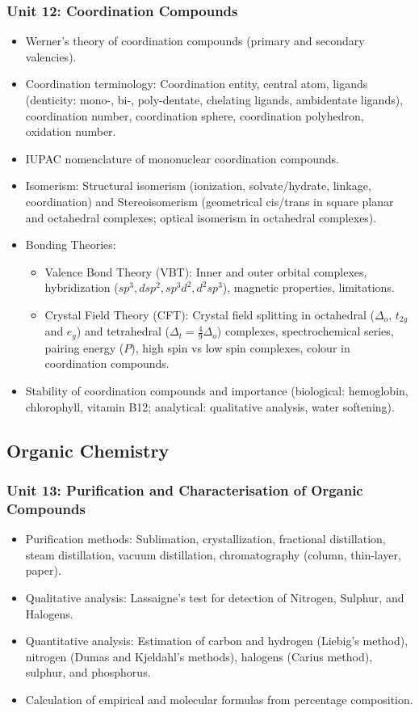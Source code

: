 \documentclass[11pt,a4paper]{article}
\begin{document}
\subsubsection{Unit 12: Coordination Compounds}
\begin{itemize}
  \item Werner's theory of coordination compounds (primary and secondary valencies).
  \item Coordination terminology: Coordination entity, central atom, ligands (denticity: mono-, bi-, poly-dentate, chelating ligands, ambidentate ligands), coordination number, coordination sphere, coordination polyhedron, oxidation number.
  \item IUPAC nomenclature of mononuclear coordination compounds.
  \item Isomerism: Structural isomerism (ionization, solvate/hydrate, linkage, coordination) and Stereoisomerism (geometrical cis/trans in square planar and octahedral complexes; optical isomerism in octahedral complexes).
  \item Bonding Theories:
  \begin{itemize}
    \item Valence Bond Theory (VBT): Inner and outer orbital complexes, hybridization ($sp^3, dsp^2, sp^3d^2, d^2sp^3$), magnetic properties, limitations.
    \item Crystal Field Theory (CFT): Crystal field splitting in octahedral ($\Delta_o$, $t_{2g}$ and $e_g$) and tetrahedral ($\Delta_t = \frac{4}{9}\Delta_o$) complexes, spectrochemical series, pairing energy ($P$), high spin vs low spin complexes, colour in coordination compounds.
  \end{itemize}
  \item Stability of coordination compounds and importance (biological: hemoglobin, chlorophyll, vitamin B12; analytical: qualitative analysis, water softening).
\end{itemize}

\subsection{Organic Chemistry}

\subsubsection{Unit 13: Purification and Characterisation of Organic Compounds}
\begin{itemize}
  \item Purification methods: Sublimation, crystallization, fractional distillation, steam distillation, vacuum distillation, chromatography (column, thin-layer, paper).
  \item Qualitative analysis: Lassaigne's test for detection of Nitrogen, Sulphur, and Halogens.
  \item Quantitative analysis: Estimation of carbon and hydrogen (Liebig's method), nitrogen (Dumas and Kjeldahl's methods), halogens (Carius method), sulphur, and phosphorus.
  \item Calculation of empirical and molecular formulas from percentage composition.
\end{itemize}
\end{document}
